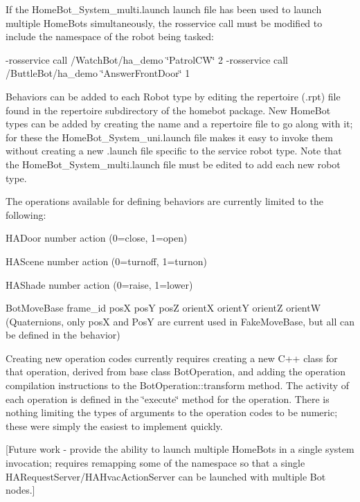 If the Home\-Bot\-\_\-\-System\-\_\-multi.\-launch launch file has been used to launch multiple Home\-Bots simultaneously, the rosservice call must be modified to include the namespace of the robot being tasked\-:

-\/rosservice call /\-Watch\-Bot/ha\-\_\-demo \char`\"{}\-Patrol\-C\-W\char`\"{} 2 -\/rosservice call /\-Buttle\-Bot/ha\-\_\-demo \char`\"{}\-Answer\-Front\-Door\char`\"{} 1

Behaviors can be added to each Robot type by editing the repertoire (.rpt) file found in the repertoire subdirectory of the homebot package. New Home\-Bot types can be added by creating the name and a repertoire file to go along with it; for these the Home\-Bot\-\_\-\-System\-\_\-uni.\-launch file makes it easy to invoke them without creating a new .launch file specific to the service robot type. Note that the Home\-Bot\-\_\-\-System\-\_\-multi.\-launch file must be edited to add each new robot type.

The operations available for defining behaviors are currently limited to the following\-:


\begin{DoxyItemize}
\item H\-A\-Door number action (0=close, 1=open)
\item H\-A\-Scene number action (0=turnoff, 1=turnon)
\item H\-A\-Shade number action (0=raise, 1=lower)
\item Bot\-Move\-Base frame\-\_\-id pos\-X pos\-Y pos\-Z orient\-X orient\-Y orient\-Z orient\-W (Quaternions, only pos\-X and Pos\-Y are current used in Fake\-Move\-Base, but all can be defined in the behavior)
\end{DoxyItemize}

Creating new operation codes currently requires creating a new C++ class for that operation, derived from base class Bot\-Operation, and adding the operation compilation instructions to the Bot\-Operation\-::transform method. The activity of each operation is defined in the \char`\"{}execute\char`\"{} method for the operation. There is nothing limiting the types of arguments to the operation codes to be numeric; these were simply the easiest to implement quickly.

\mbox{[}Future work -\/ provide the ability to launch multiple Home\-Bots in a single system invocation; requires remapping some of the namespace so that a single H\-A\-Request\-Server/\-H\-A\-Hvac\-Action\-Server can be launched with multiple Bot nodes.\mbox{]}


